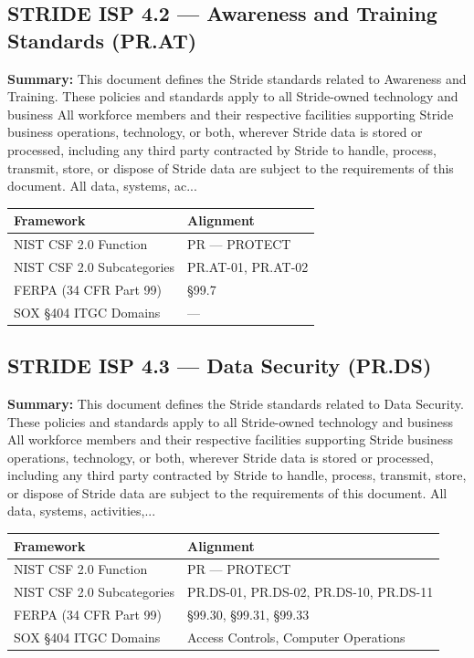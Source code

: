 \documentclass[11pt,landscape]{article}
\begin{document}
\subsection{\textcolor{strideblue}{STRIDE ISP 4.2} --- Awareness and Training Standards (PR.AT)}
\label{pol:ISP42}

\textbf{Summary:} This document defines the Stride standards related to Awareness and Training. These policies and standards apply to all Stride-owned technology and business All workforce members and their respective facilities supporting Stride business operations, technology, or both, wherever Stride data is stored or processed, including any third party contracted by Stride to handle, process, transmit, store, or dispose of Stride data are subject to the requirements of this document. All data, systems, ac...

\begin{tabularx}{\textwidth}{|p{4cm}|X|}
\hline
\rowcolor{headgray} \textbf{Framework} & \textbf{Alignment} \\
\hline
NIST CSF 2.0 Function & PR --- PROTECT \\
\hline
NIST CSF 2.0 Subcategories & PR.AT-01, PR.AT-02 \\
\hline
FERPA (34 CFR Part 99) & §99.7 \\
\hline
SOX §404 ITGC Domains & --- \\
\hline
\end{tabularx}


\subsection{\textcolor{strideblue}{STRIDE ISP 4.3} --- Data Security (PR.DS)}
\label{pol:ISP43}

\textbf{Summary:} This document defines the Stride standards related to Data Security. These policies and standards apply to all Stride-owned technology and business All workforce members and their respective facilities supporting Stride business operations, technology, or both, wherever Stride data is stored or processed, including any third party contracted by Stride to handle, process, transmit, store, or dispose of Stride data are subject to the requirements of this document. All data, systems, activities,...

\begin{tabularx}{\textwidth}{|p{4cm}|X|}
\hline
\rowcolor{headgray} \textbf{Framework} & \textbf{Alignment} \\
\hline
NIST CSF 2.0 Function & PR --- PROTECT \\
\hline
NIST CSF 2.0 Subcategories & PR.DS-01, PR.DS-02, PR.DS-10, PR.DS-11 \\
\hline
FERPA (34 CFR Part 99) & §99.30, §99.31, §99.33 \\
\hline
SOX §404 ITGC Domains & Access Controls, Computer Operations \\
\hline
\end{tabularx}
\end{document}
